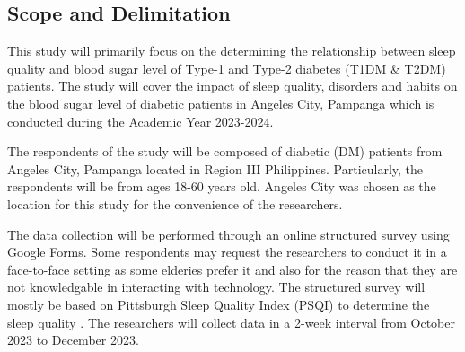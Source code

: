 \subsection*{Scope and Delimitation}

This study will primarily focus on the determining the relationship between
sleep quality and blood sugar level of Type-1 and Type-2 diabetes (T1DM \& T2DM)
patients. The study will cover the impact of sleep quality, disorders and habits
on the blood sugar level of diabetic patients in Angeles City, Pampanga which is
conducted during the Academic Year 2023-2024.

The respondents of the study will be composed of diabetic (DM) patients from
Angeles City, Pampanga located in Region III Philippines. Particularly, the
respondents will be from ages 18-60 years old. Angeles City was chosen as the
location for this study for the convenience of the researchers.

The data collection will be performed through an online structured survey using
Google Forms. Some respondents may request the researchers to conduct it in a
face-to-face setting as some elderies prefer it and also for the reason that
they are not knowledgable in interacting with technology. The structured survey
will mostly be based on Pittsburgh Sleep Quality Index (PSQI) to determine the
sleep quality \parencite{xu-2019}. The researchers will collect data in a 2-week
interval from October 2023 to December 2023.

